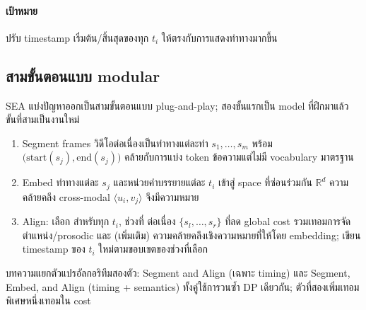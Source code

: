 \documentclass[11pt,a4paper]{article}
\def\textbf#1{#1}%
\def\emph#1{#1}%
\begin{document}
\paragraph{เป้าหมาย}
ปรับ timestamp เริ่มต้น/สิ้นสุดของทุก $t_i$ ให้ตรงกับการแสดงท่าทางมากขึ้น

\subsection{สามขั้นตอนแบบ modular}
SEA แบ่งปัญหาออกเป็นสามขั้นตอนแบบ plug-and-play;
สองขั้นแรกเป็น model ที่ฝึกมาแล้ว ขั้นที่สามเป็นงานใหม่
\begin{enumerate}[leftmargin=1.5em]
  \item \textbf{Segment} frames วิดีโอต่อเนื่องเป็นท่าทางแต่ละท่า
        $s_1, \ldots, s_m$ พร้อม $\bigl(\mathrm{start}(s_j), \mathrm{end}(s_j)\bigr)$
        คล้ายกับการแบ่ง token ข้อความแต่ไม่มี vocabulary มาตรฐาน
  \item \textbf{Embed} ท่าทางแต่ละ $s_j$ และหน่วยคำบรรยายแต่ละ $t_i$
        เข้าสู่ space ที่ซ่อนร่วมกัน $\mathbb{R}^d$
        ความคล้ายคลึง cross-modal $\langle u_i, v_j \rangle$ จึงมีความหมาย
  \item \textbf{Align}: เลือก สำหรับทุก $t_i$, ช่วงที่ \emph{ต่อเนื่อง}
        $\{s_l, \ldots, s_r\}$ ที่ลด global cost รวมเทอมการจัดตำแหน่ง/prosodic
        และ (เพิ่มเติม) ความคล้ายคลึงเชิงความหมายที่ให้โดย embedding;
        เขียน timestamp ของ $t_i$ ใหม่ตามขอบเขตของช่วงที่เลือก
\end{enumerate}

บทความแยกตัวแปรอัลกอริทึมสองตัว:
\textbf{Segment and Align} (เฉพาะ timing) และ \textbf{Segment, Embed, and
Align} (timing + semantics) ทั้งคู่ใช้การวนซ้ำ DP เดียวกัน;
ตัวที่สองเพิ่มเทอมพิเศษหนึ่งเทอมใน cost
\end{document}
